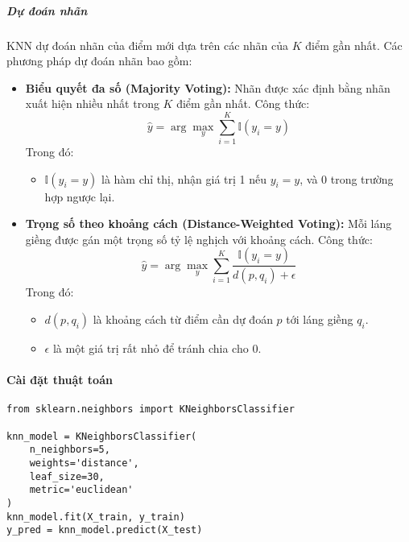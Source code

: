 \documentclass[a4paper,12pt]{article}
\begin{document}
\subparagraph{Dự đoán nhãn}  
\hspace{5mm}KNN dự đoán nhãn của điểm mới dựa trên các nhãn của \(K\) điểm gần nhất. Các phương pháp dự đoán nhãn bao gồm:
\begin{itemize}
    \item \textbf{Biểu quyết đa số (Majority Voting):} Nhãn được xác định bằng nhãn xuất hiện nhiều nhất trong \(K\) điểm gần nhất. Công thức:
    \[
    \hat{y} = \arg \max_y \sum_{i=1}^K \mathbb{I}(y_i = y)
    \]
    Trong đó:
    \begin{itemize}
        \item \(\mathbb{I}(y_i = y)\) là hàm chỉ thị, nhận giá trị 1 nếu \(y_i = y\), và 0 trong trường hợp ngược lại.
    \end{itemize}

    \item \textbf{Trọng số theo khoảng cách (Distance-Weighted Voting):} Mỗi láng giềng được gán một trọng số tỷ lệ nghịch với khoảng cách. Công thức:
    \[
    \hat{y} = \arg \max_y \sum_{i=1}^K \frac{\mathbb{I}(y_i = y)}{d(p, q_i) + \epsilon}
    \]
    Trong đó:
    \begin{itemize}
        \item \(d(p, q_i)\) là khoảng cách từ điểm cần dự đoán \(p\) tới láng giềng \(q_i\).
        \item \(\epsilon\) là một giá trị rất nhỏ để tránh chia cho 0.
    \end{itemize}
\end{itemize}

\paragraph{Cài đặt thuật toán}

\begin{verbatim}
from sklearn.neighbors import KNeighborsClassifier

knn_model = KNeighborsClassifier(
    n_neighbors=5, 
    weights='distance', 
    leaf_size=30, 
    metric='euclidean'
)
knn_model.fit(X_train, y_train)
y_pred = knn_model.predict(X_test)
\end{verbatim}
\end{document}
